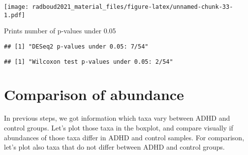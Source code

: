 \documentclass[
]{book}
\newenvironment{Shaded}{\begin{snugshade}}{\end{snugshade}}
\newcommand{\AttributeTok}[1]{\textcolor[rgb]{0.77,0.63,0.00}{#1}}
\newcommand{\ConstantTok}[1]{\textcolor[rgb]{0.00,0.00,0.00}{#1}}
\newcommand{\FloatTok}[1]{\textcolor[rgb]{0.00,0.00,0.81}{#1}}
\newcommand{\FunctionTok}[1]{\textcolor[rgb]{0.00,0.00,0.00}{#1}}
\newcommand{\NormalTok}[1]{#1}
\newcommand{\SpecialCharTok}[1]{\textcolor[rgb]{0.00,0.00,0.00}{#1}}
\newcommand{\StringTok}[1]{\textcolor[rgb]{0.31,0.60,0.02}{#1}}
\begin{document}
\texttt{[image: radboud2021\_material\_files/figure-latex/unnamed-chunk-33-1.pdf]}

Prints number of p-values under 0.05

\begin{Shaded}
\end{Shaded}

\begin{verbatim}
## [1] "DESeq2 p-values under 0.05: 7/54"
\end{verbatim}

\begin{Shaded}
\end{Shaded}

\begin{verbatim}
## [1] "Wilcoxon test p-values under 0.05: 2/54"
\end{verbatim}

\hypertarget{comparison-of-abundance}{%
\section{Comparison of abundance}\label{comparison-of-abundance}}

In previous steps, we got information which taxa vary between ADHD and control groups.
Let's plot those taxa in the boxplot, and compare visually if abundances of those taxa
differ in ADHD and control samples. For comparison, let's plot also taxa that do not
differ between ADHD and control groups.
\end{document}
